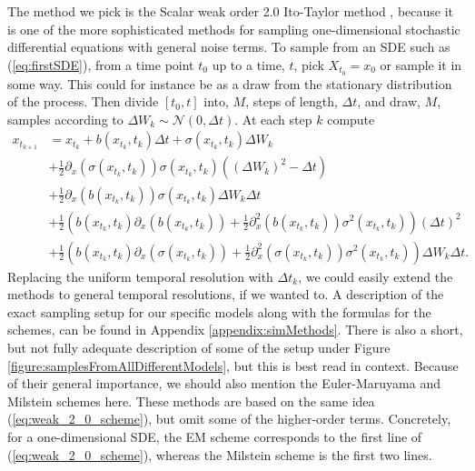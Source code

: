 The method we pick is the Scalar weak order 2.0 Ito-Taylor method \cite[Algorithm 8.5]{Srkk2019}, because it is one of the more sophisticated methods for sampling one-dimensional stochastic differential equations with general noise terms. To sample from an SDE such as (\ref{eq:firstSDE}), from a time point $t_0$ up to a time, $t$, pick $X_{t_0} = x_0$ or sample it in some way. This could for instance be as a draw from the stationary distribution of the process. Then divide $[t_0, t]$ into, $M$, steps of length, $\Delta t$, and draw, $M$, samples according to $\Delta W_k\sim\mathcal{N}\left(0, \Delta t\right)$. At each step $k$ compute
\begin{align}
    x_{t_{k + 1}} &= x_{t_{k}} + b(x_{t_{k}}, t_k)\Delta t + \sigma\left(x_{t_{k}}, t_k\right)\Delta W_k \nonumber \\
    &+ \frac{1}{2}\partial_x \left(\sigma\left(x_{t_{k}}, t_k\right)\right)\sigma\left(x_{t_{k}}, t_k\right)\left(\left(\Delta W_k\right)^2 - \Delta t\right) \nonumber \\
    &+ \frac{1}{2}\partial_x \left(b(x_{t_{k}}, t_k)\right)\sigma(x_{t_{k}}, t_k) \Delta W_k\Delta t \nonumber \\
    &+ \frac{1}{2}\left(b(x_{t_{k}}, t_k)\partial_x\left(b(x_{t_{k}}, t_k)\right) + \frac{1}{2}\partial_x^2\left(b\left(x_{t_k}, t_k\right)\right)\sigma^2(x_{t_k}, t_k)\right)\left(\Delta t\right)^2 \nonumber \\
    &+ \frac{1}{2}\left(b(x_{t_{k}}, t_k)\partial_x \left(\sigma(x_{t_{k}}, t_k)\right) + \frac{1}{2}\partial_x^2\left(\sigma(x_{t_k}, t_k)\right)\sigma^2(x_{t_k}, t_k)\right)\Delta W_k\Delta t. \label{eq:weak_2_0_scheme}
\end{align}
Replacing the uniform temporal resolution with $\Delta t_k$, we could easily extend the methods to general temporal resolutions, if we wanted to.
A description of the exact sampling setup for our specific models along with the formulas for the schemes, can be found in Appendix \ref{appendix:simMethods}. There is also a short, but not fully adequate description of some of the setup under Figure \ref{figure:samplesFromAllDifferentModels}, but this is best read in context. Because of their general importance, we should also mention the Euler-Maruyama and Milstein schemes here. These methods are based on the same idea (\ref{eq:weak_2_0_scheme}), but omit some of the higher-order terms. Concretely, for a one-dimensional SDE, the EM scheme corresponds to the first line of (\ref{eq:weak_2_0_scheme}), whereas the Milstein scheme is the first two lines.

